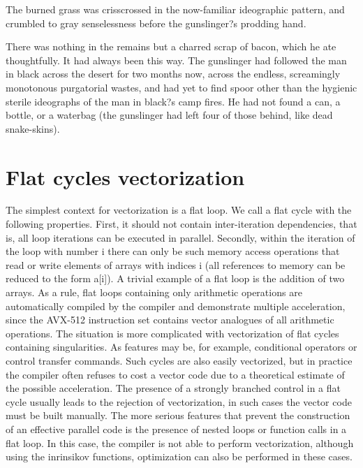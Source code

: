 \documentclass[
11pt,%
tightenlines,%
twoside,%
onecolumn,%
nofloats,%
nobibnotes,%
nofootinbib,%
superscriptaddress,%
noshowpacs,%
centertags]%
{revtex4}
\begin{document}
The burned grass was crisscrossed in the now-familiar ideographic pattern, and crumbled to gray senselessness before the gunslinger?s prodding hand. 

There was nothing in the remains but a charred scrap of bacon, which he ate thoughtfully. It had always been this way. The gunslinger had followed the man in black across the desert for two months now, across the endless, screamingly monotonous purgatorial wastes, and had yet to find spoor other than the hygienic sterile ideographs of the man in black?s camp fires. He had not found a can, a bottle, or a waterbag (the gunslinger had left four of those behind, like dead snake-skins).

\section{Flat cycles vectorization}

The simplest context for vectorization is a flat loop. We call a flat cycle with the following properties. First, it should not contain inter-iteration dependencies, that is, all loop iterations can be executed in parallel. Secondly, within the iteration of the loop with number i there can only be such memory access operations that read or write elements of arrays with indices i (all references to memory can be reduced to the form a[i]). A trivial example of a flat loop is the addition of two arrays. As a rule, flat loops containing only arithmetic operations are automatically compiled by the compiler and demonstrate multiple acceleration, since the AVX-512 instruction set contains vector analogues of all arithmetic operations. The situation is more complicated with vectorization of flat cycles containing singularities. As features may be, for example, conditional operators or control transfer commands. Such cycles are also easily vectorized, but in practice the compiler often refuses to cost a vector code due to a theoretical estimate of the possible acceleration. The presence of a strongly branched control in a flat cycle usually leads to the rejection of vectorization, in such cases the vector code must be built manually. The more serious features that prevent the construction of an effective parallel code is the presence of nested loops or function calls in a flat loop. In this case, the compiler is not able to perform vectorization, although using the inrinsikov functions, optimization can also be performed in these cases.
\end{document}
